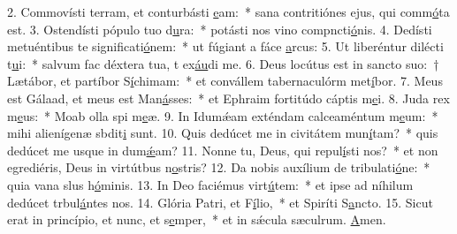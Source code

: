 2. Commovísti terram, et conturbásti \uline{e}am:~* sana contritiónes ejus, qui comm\uline{ó}ta est.
3. Ostendísti pópulo tuo d\uline{u}ra:~* potásti nos vino compncti\uline{ó}nis.
4. Dedísti metuéntibus te significati\uline{ó}nem:~* ut fúgiant a fáce \uline{a}rcus:
5. Ut liberéntur dilécti t\uline{u}i:~* salvum fac déxtera tua, t ex\uline{áu}di me.
6. Deus locútus est in sancto suo:~† Lætábor, et partíbor S\uline{í}chimam:~* et convállem tabernaculórm met\uline{í}bor.
7. Meus est Gálaad, et meus est Man\uline{á}sses:~* et Ephraim fortitúdo cáptis m\uline{e}i.
8. Juda rex m\uline{e}us:~* Moab olla spi m\uline{e}æ.
9. In Idumǽam exténdam calceaméntum m\uline{e}um:~* mihi alienígenæ sbdit\uline{i} sunt.
10. Quis dedúcet me in civitátem mun\uline{í}tam?~* quis dedúcet me usque in dum\uline{ǽ}am?
11. Nonne tu, Deus, qui repul\uline{í}sti nos?~* et non egrediéris, Deus in virtútbus n\uline{o}stris?
12. Da nobis auxílium de tribulati\uline{ó}ne:~* quia vana slus h\uline{ó}minis.
13. In Deo faciémus virt\uline{ú}tem:~* et ipse ad níhilum dedúcet trbul\uline{á}ntes nos.
14. Glória Patri, et F\uline{í}lio,~* et Spiríti S\uline{a}ncto.
15. Sicut erat in princípio, et nunc, et s\uline{e}mper,~* et in sǽcula sæculrum. \uline{A}men.
